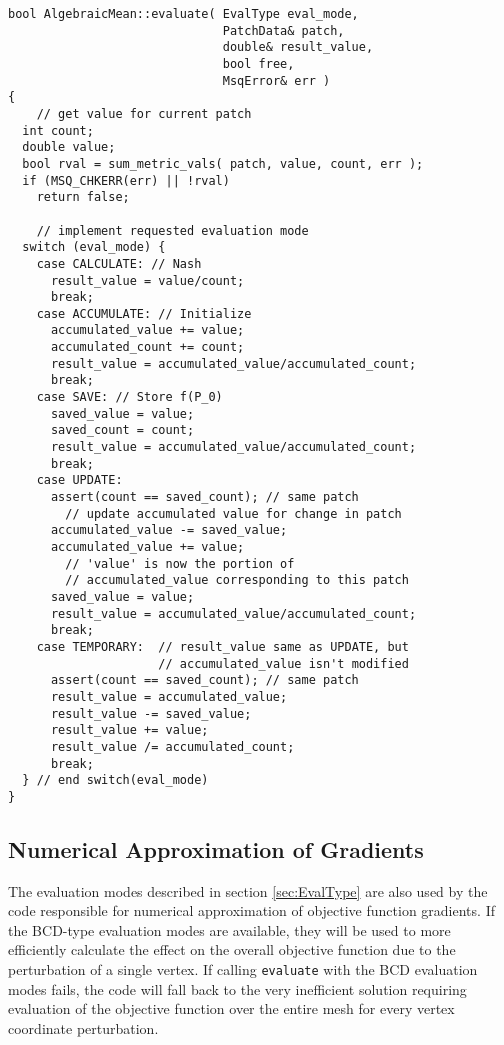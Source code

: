 \documentclass{article}
\begin{document}
\begin{lstlisting}[caption={Example of \texttt{EvalType} implementation (algebraic mean).},label={lst:evaltype-pseudo}]
bool AlgebraicMean::evaluate( EvalType eval_mode,
                              PatchData& patch,
                              double& result_value,
                              bool free,
                              MsqError& err )
{
    // get value for current patch
  int count;
  double value;
  bool rval = sum_metric_vals( patch, value, count, err );
  if (MSQ_CHKERR(err) || !rval)
    return false;

    // implement requested evaluation mode
  switch (eval_mode) {
    case CALCULATE: // Nash
      result_value = value/count;
      break;
    case ACCUMULATE: // Initialize
      accumulated_value += value;
      accumulated_count += count;
      result_value = accumulated_value/accumulated_count;
      break;
    case SAVE: // Store f(P_0)
      saved_value = value;
      saved_count = count;
      result_value = accumulated_value/accumulated_count;
      break;
    case UPDATE:
      assert(count == saved_count); // same patch
        // update accumulated value for change in patch
      accumulated_value -= saved_value;
      accumulated_value += value;
        // 'value' is now the portion of
        // accumulated_value corresponding to this patch
      saved_value = value;
      result_value = accumulated_value/accumulated_count;
      break;
    case TEMPORARY:  // result_value same as UPDATE, but
                     // accumulated_value isn't modified
      assert(count == saved_count); // same patch
      result_value = accumulated_value;
      result_value -= saved_value;
      result_value += value;
      result_value /= accumulated_count;
      break;
  } // end switch(eval_mode)
}
\end{lstlisting}

\subsection{Numerical Approximation of Gradients}

The evaluation modes described in section \ref{sec:EvalType} are also used by the code responsible for numerical approximation of objective function gradients.  If the BCD-type evaluation modes are available, they will be used to more efficiently calculate the effect on the overall objective function due to the perturbation of a single vertex.  If calling \texttt{evaluate} with the BCD evaluation modes fails, the code will fall back to the very inefficient solution requiring evaluation of the objective function over the entire mesh for every vertex coordinate perturbation.
\end{document}

